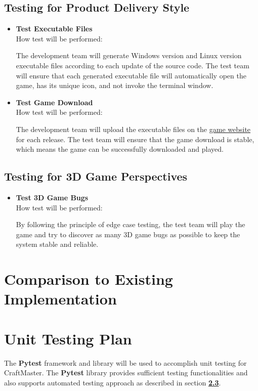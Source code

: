 \documentclass[12pt, titlepage]{article}
\begin{document}
\subsection*{Testing for Product Delivery Style}
\begin{itemize}


\item{\textbf{Test Executable Files}\\}
How test will be performed:

The development team will generate Windows version and Linux version executable files according to each update of the source code. The test team will ensure that each generated executable file will automatically open the game, has its unique icon, and not invoke the terminal window.

\item{\textbf{Test Game Download}\\}
How test will be performed:

The development team will upload the executable files on the \href{http://rexwangsida.pythonanywhere.com/}{game website} for each release. The test team will ensure that the game download is stable, which means the game can be successfully downloaded and played.
\end{itemize}
\subsection*{Testing for 3D Game Perspectives}
\begin{itemize}
\item{\textbf{Test 3D Game Bugs}\\}
How test will be performed:

By following the principle of edge case testing, the test team will play the game and try to discover as many 3D game bugs as possible to keep the system stable and reliable.

\end{itemize}


\section{Comparison to Existing Implementation}

\section{Unit Testing Plan}
The \textbf{Pytest} framework and library will be used to accomplish unit testing for CraftMaster. The \textbf{Pytest} library provides sufficient testing functionalities and also supports automated testing approach as described in section \hyperref[sec:2.3]{\textbf{2.3}}.
\end{document}
